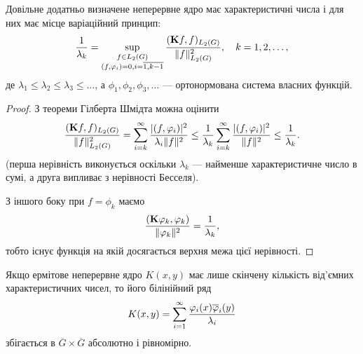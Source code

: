 \begin{lemma}
    Довільне додатньо визначене неперервне ядро має характеристичні числа і для них має місце варіаційний принцип:
    \begin{equation}
        \dfrac{1}{\lambda_k} = \Sup_{\substack{f \in L_2(G) \\ (f, \phi_i) = 0, i = \overline{1, k - 1}}} \dfrac{(\bf{K}f, f)_{L_2(G)}}{\|f\|_{L_2(G)}^2}, \quad k = 1, 2, \ldots,
    \end{equation}
    де $\lambda_1 \le \lambda_2 \le \lambda_3 \le \ldots$, а $\phi_1, \phi_2, \phi_3, \ldots$ --- ортонормована система власних функцій.
\end{lemma}

\begin{proof}
    З теореми Гілберта Шмідта можна оцінити 
    \begin{equation}
        \dfrac{(\bf{K}f, f)_{L_2(G)}}{\|f\|_{L_2(G)}^2} = \Sum_{i=k}^\infty \dfrac{|(f, \phi_i)|^2}{\lambda_i\|f\|^2} \le \dfrac{1}{\lambda_k} \Sum_{i=k}^\infty \dfrac{|(f, \phi_i)|^2}{\|f\|^2} \le \dfrac{1}{\lambda_k}.
    \end{equation}
    (перша нерівність виконується оскільки $\lambda_k$ --- найменше характеристичне число в сумі, а друга випливає з нерівності Бесселя). \medskip

    З іншого боку при $f = \phi_k$ маємо
    \begin{equation}
        \frac{(\bf{K}\phi_k, \phi_k)}{\|\phi_k\|^2} = \frac{1}{\lambda_k},
    \end{equation}
    тобто існує функція на якій досягається верхня межа цієї нерівності.
\end{proof}

\begin{theorem} 
    Якщо ермітове неперервне ядро $K(x, y)$ має лише скінчену кількість від'ємних характеристичних чисел, то його білінійний ряд 
    \begin{equation}
        K(x,y)=\Sum_{i=1}^\infty\dfrac{\phi_i(x)\overline\phi_i(y)}{\lambda_i}
    \end{equation}
    збігається в $\overline G\times\overline G$ абсолютно і рівномірно.
\end{theorem}

